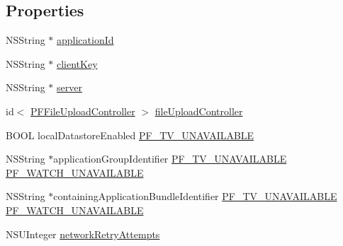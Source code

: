 \subsection*{Properties}
\begin{DoxyCompactItemize}
\item 
N\+S\+String $\ast$ \hyperlink{protocol_parse_mutable_client_configuration-p_a26cbffdca27f76ffdfcc8e83ed056a8e}{application\+Id}
\begin{DoxyCompactList}\small\item\em 

 \end{DoxyCompactList}\item 
N\+S\+String $\ast$ \hyperlink{protocol_parse_mutable_client_configuration-p_a6c73abadbf4fc85fe62e5e7477f0f78f}{client\+Key}
\item 
N\+S\+String $\ast$ \hyperlink{protocol_parse_mutable_client_configuration-p_a42bf5a15b0cc4cf6203c9e7950a6ffdb}{server}
\item 
id$<$ \hyperlink{protocol_p_f_file_upload_controller-p}{P\+F\+File\+Upload\+Controller} $>$ \hyperlink{protocol_parse_mutable_client_configuration-p_a9f3487a92978a6f57853b73174e23b35}{file\+Upload\+Controller}
\item 
B\+O\+O\+L local\+Datastore\+Enabled \hyperlink{protocol_parse_mutable_client_configuration-p_a06b87ec028620d2c0a31751bb81ee21b}{P\+F\+\_\+\+T\+V\+\_\+\+U\+N\+A\+V\+A\+I\+L\+A\+B\+L\+E}
\begin{DoxyCompactList}\small\item\em 

 \end{DoxyCompactList}\item 
N\+S\+String $\ast$application\+Group\+Identifier \hyperlink{protocol_parse_mutable_client_configuration-p_a06b87ec028620d2c0a31751bb81ee21b}{P\+F\+\_\+\+T\+V\+\_\+\+U\+N\+A\+V\+A\+I\+L\+A\+B\+L\+E} \hyperlink{protocol_parse_mutable_client_configuration-p_a82388e3ffd9d003568d31d3b529afa2c}{P\+F\+\_\+\+W\+A\+T\+C\+H\+\_\+\+U\+N\+A\+V\+A\+I\+L\+A\+B\+L\+E}
\begin{DoxyCompactList}\small\item\em 

 \end{DoxyCompactList}\item 
N\+S\+String $\ast$containing\+Application\+Bundle\+Identifier \hyperlink{protocol_parse_mutable_client_configuration-p_a06b87ec028620d2c0a31751bb81ee21b}{P\+F\+\_\+\+T\+V\+\_\+\+U\+N\+A\+V\+A\+I\+L\+A\+B\+L\+E} \hyperlink{protocol_parse_mutable_client_configuration-p_a0b25558cbdcf4b583196b1eca6d35b63}{P\+F\+\_\+\+W\+A\+T\+C\+H\+\_\+\+U\+N\+A\+V\+A\+I\+L\+A\+B\+L\+E}
\item 
N\+S\+U\+Integer \hyperlink{protocol_parse_mutable_client_configuration-p_a3f32025c46ed41103e5833b6b63eae1c}{network\+Retry\+Attempts}
\begin{DoxyCompactList}\small\item\em 

 \end{DoxyCompactList}\end{DoxyCompactItemize}


